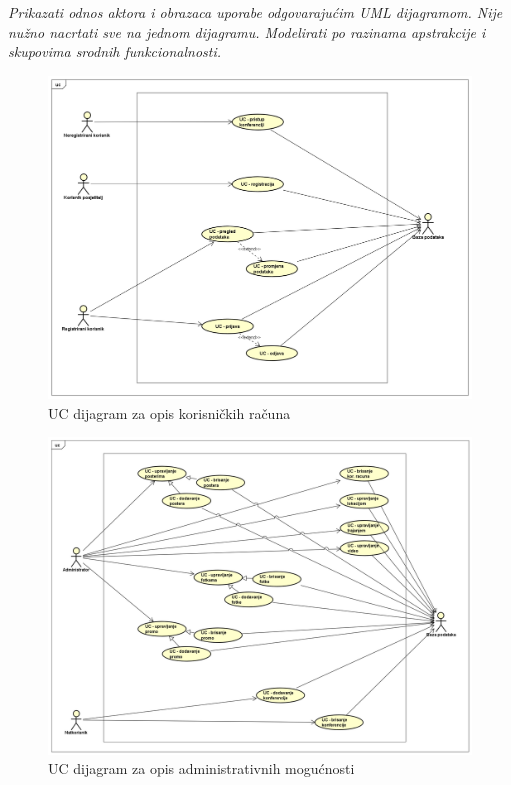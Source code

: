 					\textit{Prikazati odnos aktora i obrazaca uporabe odgovarajućim UML dijagramom. Nije nužno nacrtati sve na jednom dijagramu. Modelirati po razinama apstrakcije i skupovima srodnih funkcionalnosti.}
					\begin{figure}
						\includegraphics[width=\linewidth]{Slike/UCDiagramUserProfiles.png}
						\caption{UC dijagram za opis korisničkih računa}
					\end{figure}
					
					\begin{figure}
						\includegraphics[width=\linewidth]{Slike/UCDiagramAdmin.png}
						\caption{UC dijagram za opis administrativnih mogućnosti}
					\end{figure}
				
